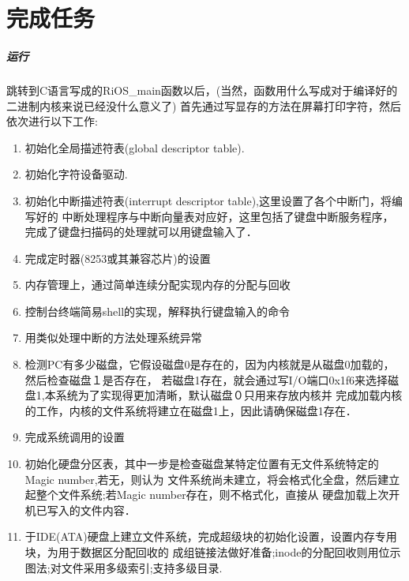 \section{完成任务} 
\subparagraph{运行}
跳转到C语言写成的RiOS\_main函数以后，(当然，函数用什么写成对于编译好的二进制内核来说已经没什么意义了)
首先通过写显存的方法在屏幕打印字符，然后依次进行以下工作:
\begin{enumerate}
\item 初始化全局描述符表(global descriptor table).
\item 初始化字符设备驱动.
\item 初始化中断描述符表(interrupt descriptor table),这里设置了各个中断门，将编写好的
中断处理程序与中断向量表对应好，这里包括了键盘中断服务程序，完成了键盘扫描码的处理就可以用键盘输入了．
\item 完成定时器(8253或其兼容芯片)的设置
\item 内存管理上，通过简单连续分配实现内存的分配与回收
\item 控制台终端简易shell的实现，解释执行键盘输入的命令
\item 用类似处理中断的方法处理系统异常
\item 检测PC有多少磁盘，它假设磁盘0是存在的，因为内核就是从磁盘0加载的，然后检查磁盘１是否存在，
若磁盘1存在，就会通过写I/O端口0x1f6来选择磁盘1,本系统为了实现得更加清晰，默认磁盘０只用来存放内核并
完成加载内核的工作，内核的文件系统将建立在磁盘1上，因此请确保磁盘1存在．
\item 完成系统调用的设置
\item 初始化硬盘分区表，其中一步是检查磁盘某特定位置有无文件系统特定的Magic number,若无，则认为
文件系统尚未建立，将会格式化全盘，然后建立起整个文件系统;若Magic number存在，则不格式化，直接从
硬盘加载上次开机已写入的文件内容．
\item 于IDE(ATA)硬盘上建立文件系统，完成超级块的初始化设置，设置内存专用块，为用于数据区分配回收的
成组链接法做好准备;inode的分配回收则用位示图法;对文件采用多级索引;支持多级目录.
\end{enumerate}


